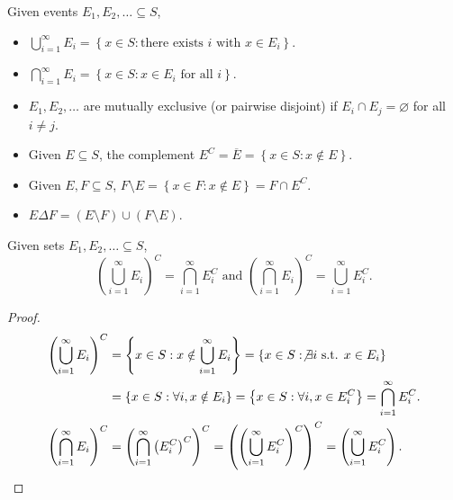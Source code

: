 
\begin{definition}
    Given events \(E_1, E_2, \dots \subseteq S\), 
    \begin{itemize}
        \item \(\bigcup_{i=1}^{\infty} E_i = \left\{ x \in S : \text{there exists } i \text{ with } x \in E_i   \right\}  \). 
        \item \(\bigcap_{i=1}^{\infty} E_i = \left\{ x \in S: x \in E_i \text{ for all } i  \right\}  \). 
        \item \(E_1, E_2, \dots \) are mutually exclusive (or pairwise disjoint) if \(E_i \cap E_j = \varnothing \) for all \(i \neq j\).     
        \item Given \(E \subseteq S\), the complement \(E^C = \overline{E} = \left\{ x \in S: x \notin E \right\} \). 
        \item Given \(E, F \subseteq S\), \(F \setminus E = \left\{ x \in F: x \notin E \right\} = F \cap E^C \). 
        \item \(E \Delta F = (E \setminus F) \cup (F \setminus E)\).     
    \end{itemize} 
\end{definition}

\begin{proposition}
    Given sets \(E_1, E_2, \dots \subseteq S\), 
    \[
        \left( \bigcup_{i=1}^{\infty} E_i  \right)^C = \bigcap_{i=1}^{\infty} E_i^C \text{ and } \left( \bigcap_{i=1}^{\infty} E_i  \right)^C = \bigcup_{i=1}^{\infty} E_i^C.     
    \] 
\end{proposition}

\begin{proof}
    \begin{align*}
        \left( \bigcup_{i=1}^{\infty} E_i  \right)^C &= \left\{ x \in S : x \notin \bigcup_{i=1}^{\infty} E_i  \right\} = \left\{ x \in S: \not\exists i \text{ s.t. } x \in E_i  \right\} \\
        &= \left\{ x \in S: \forall i, x \notin E_i \right\} = \left\{ x \in S: \forall i, x \in E_i^C \right\} = \bigcap_{i=1}^{\infty} E_i^C .  \\
        \left( \bigcap_{i=1}^{\infty} E_i  \right)^C &= \left( \bigcap_{i=1}^{\infty} \left( E_i^C \right)^C   \right)^C = \left( \left( \bigcup_{i=1}^{\infty} E_i^C  \right)^C \right)^C = \left( \bigcup_{i=1}^{\infty} E_i^C  \right).         
    \end{align*}
\end{proof}

